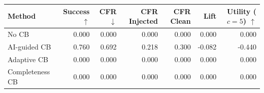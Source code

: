 \begin{tabular}{lrrrrrr}
\toprule
Method & Success $\uparrow$ & CFR $\downarrow$ & CFR Injected & CFR Clean & Lift & Utility ($c=5$) $\uparrow$ \\
\midrule
No CB & 0.000 & 0.000 & 0.000 & 0.000 & 0.000 & 0.000 \\
AI-guided CB & 0.760 & 0.692 & 0.218 & 0.300 & -0.082 & -0.440 \\
Adaptive CB & 0.000 & 0.000 & 0.000 & 0.000 & 0.000 & 0.000 \\
Completeness CB & 0.000 & 0.000 & 0.000 & 0.000 & 0.000 & 0.000 \\
\bottomrule
\end{tabular}

